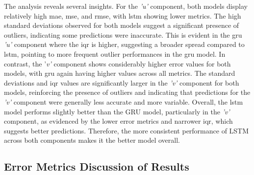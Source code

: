 The analysis reveals several insights. For the \textit{'u'} component, both models display relatively high \acrshort{mae}, \acrshort{mse}, and \acrshort{rmse}, with \acrshort{lstm} showing lower metrics. The high standard deviations observed for both models suggest a significant presence of outliers, indicating some predictions were inaccurate. This is evident in the \acrshort{gru} \textit{'u'} component where the \acrshort{iqr} is higher, suggesting a broader spread compared to \acrshort{lstm}, pointing to more frequent outlier performances in the \acrshort{gru} model. In contrast, the '\textit{v'} component shows considerably higher error values for both models, with \acrshort{gru} again having higher values across all metrics. The standard deviations and \acrshort{iqr} values are significantly larger in the \textit{'v'} component for both models, reinforcing the presence of outliers and indicating that predictions for the \textit{'v'} component were generally less accurate and more variable. Overall, the \acrshort{lstm} model performs slightly better than the GRU model, particularly in the \textit{'v'} component, as evidenced by the lower error metrics and narrower \acrshort{iqr}, which suggests better predictions. Therefore, the more consistent performance of LSTM across both components makes it the better model overall. 

\subsection{Error Metrics Discussion of Results}
\label{subsec:4.1.2}